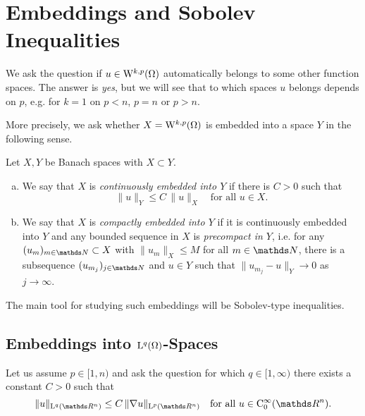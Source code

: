 \chapter{Embeddings and Sobolev Inequalities}

We ask the question if $u \in \mathrm{W}^{k,p}(\Omega)$ automatically belongs to some other function spaces.
The answer is \emph{yes}, but we will see that to which spaces $u$ belongs depends on $p$, e.g. for $k = 1$ on $p < n$, $p = n$ or $p > n$.

More precisely, we ask whether $X = \mathrm{W}^{k,p}(\Omega)$ is embedded into a space $Y$ in the following sense.

\begin{defn}
  \label{defn:embedding}
  Let $X, Y$ be Banach spaces with $X \subset Y$.
  \begin{enumerate}[a)]
    \item We say that $X$ is \emph{continuously embedded into $Y$} if there is $C > 0$ such that
      $$
      \|u\|_Y \leq C \, \|u\|_X \quad\text{for all } u \in X.
      $$
    \item We say that $X$ is \emph{compactly embedded into $Y$} if it is continuously embedded into $Y$ and any bounded sequence in $X$ is \emph{precompact in $Y$}, i.e. for any $(u_m)_{m \in \N} \subset X$ with $\|u_m\|_X \leq M$ for all $m \in \N$, there is a subsequence $(u_{m_j})_{j \in \N}$ and $u \in Y$ such that $\|u_{m_j} - u\|_Y \to 0$ as $j \to \infty$.
  \end{enumerate}
\end{defn}

The main tool for studying such embeddings will be Sobolev-type inequalities.

\section{Embeddings into \texorpdfstring{$\mathrm{L}^q(\Omega)$}{L\textasciicircum q(Omega)}-Spaces}
\label{sec:lpEmbedding}

Let us assume $p \in [1,n)$ and ask the question for which $q \in [1,\infty)$ there exists a constant $C > 0$ such that
\begin{equation}
  \label{eq:sobolevTypeIneq}
  \|u\|_{\Ell^q(\R^n)} \leq C \, \|\nabla u\|_{\Ell^p(\R^n)} \quad\text{for all } u \in \CC_0^\infty(\R^n). 
\end{equation}


